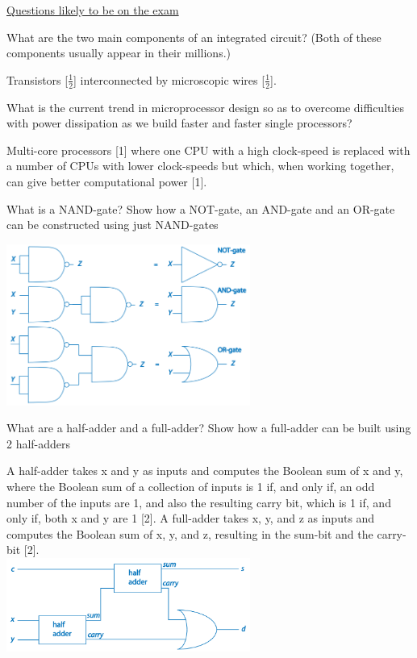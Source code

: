 \documentclass[addpoints]{exam}
\begin{document}
\begin{center}
	\underline{\huge Questions likely to be on the exam}
\end{center}
\begin{questions}
\question[1]What are the two main components of an integrated circuit? (Both of
these components usually appear in their millions.)
\begin{solution}[2in]
	Transistors [$\frac{1}{2}$] interconnected by microscopic wires [$\frac{1}{2}$].
\end{solution}


\question[2]What is the current trend in microprocessor design so as to overcome
difficulties with power dissipation as we build faster and faster single
processors?
\begin{solution}[2in]
	Multi-core processors [1] where one CPU with a high clock-speed is
	replaced with a number of CPUs with lower clock-speeds but which,
	when working together, can give better computational power [1].
\end{solution}
\question[10] What is a NAND-gate? Show how a NOT-gate, an AND-gate and an
OR-gate can be constructed using just NAND-gates
\begin{solution}[2in]
	\includegraphics[width=8cm]{NAND.png}
\end{solution}


\question[7]What are a half-adder and a full-adder? Show how a full-adder can be
built using 2 half-adders
\begin{solution}[2in]
	A half-adder takes x and y as inputs and computes the Boolean sum
	of x and y, where the Boolean sum of a collection of inputs is 1 if, and
	only if, an odd number of the inputs are 1, and also the resulting carry
	bit, which is 1 if, and only if, both x and y are 1 [2]. A full-adder takes
	x, y, and z as inputs and computes the Boolean sum of x, y, and z,
	resulting in the sum-bit and the carry-bit [2].\\
	\includegraphics[width=8cm]{full_adder.png}
\end{solution}


\end{questions}
\end{document}
